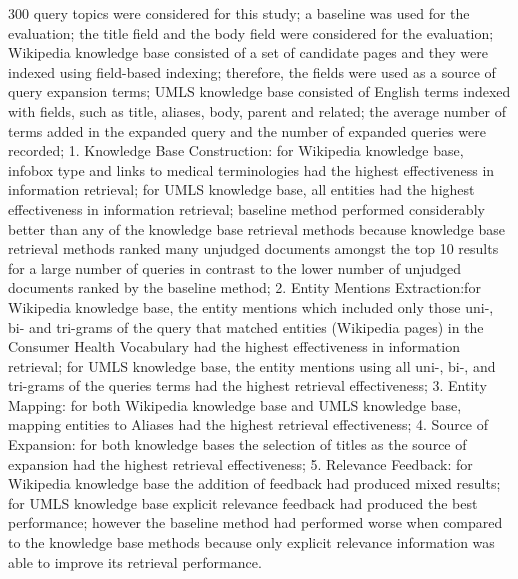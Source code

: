 \documentclass[]{article}
\begin{document}
300 query topics were considered for this study; a baseline was used for the evaluation;  the title field and the body field were considered for the evaluation; Wikipedia knowledge base consisted of a set of candidate pages and they were indexed using field-based indexing; therefore, the fields were used as a source of query expansion terms; UMLS knowledge base consisted of English terms indexed with fields, such as title, aliases, body, parent and related;  the average number of terms added in the expanded query and the number of expanded queries were recorded; 1. Knowledge Base Construction: for Wikipedia knowledge base, infobox type and links to medical terminologies had the highest effectiveness in information retrieval; for UMLS knowledge base, all entities had the highest effectiveness in information retrieval; baseline method performed considerably better than any of the knowledge base retrieval methods because  knowledge base retrieval methods ranked many unjudged documents amongst the top 10 results for a large number of queries in contrast to the lower number of unjudged documents ranked by the baseline method; 2. Entity Mentions Extraction:for Wikipedia knowledge base, the entity mentions which included only those uni-, bi- and tri-grams of the query that
matched entities (Wikipedia pages) in the Consumer Health Vocabulary had the highest effectiveness in information retrieval; for UMLS knowledge base, the entity mentions using all uni-, bi-, and tri-grams of the queries terms had the highest retrieval effectiveness; 3. Entity Mapping: for both Wikipedia knowledge base and UMLS knowledge base, mapping entities to Aliases had the highest retrieval effectiveness; 4. Source of Expansion: for both knowledge bases the selection of titles as the source of expansion had the highest retrieval effectiveness; 5. Relevance Feedback: for Wikipedia knowledge base the addition of feedback had produced mixed results; for UMLS knowledge base explicit relevance feedback had produced the best performance; however the baseline method had performed worse when compared to the knowledge base methods because only explicit relevance information was able to improve its retrieval performance.  
\end{document}
